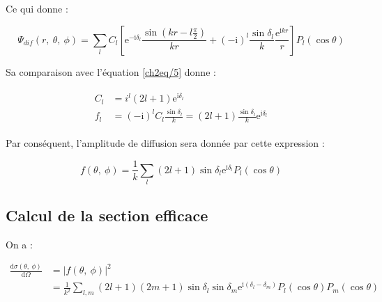\documentclass[12pt,a4paper,oneside,french]{book}
\renewcommand{\i}{\mathrm{i}}
\newcommand{\e}{\mathrm{e}}
\newcommand{\diff}{\mathrm{d}}
\theoremstyle{definition}
\theoremstyle{definition}
\theoremstyle{definition}
\theoremstyle{remark}
\theoremstyle{definition}
\begin{document}
    Ce qui donne :

    \begin{equation*}
        {\Psi}_{dif}(r, \ \theta, \ \phi) = \sum_{l} {C}_{l} \left[{\e}^{-\i {\delta}_{l}} \frac{\sin\left(k r - l \frac{\pi}{2}\right)}{k r} + {(-\i)}^{l} \frac{\sin{{\delta}_{l}}}{k} \frac{{\e}^{\i k r}}{r}\right] {P}_{l}(\cos{\theta})
    \end{equation*}

    Sa comparaison avec l'équation \eqref{ch2eq/5} donne :
    
    \begin{align*}
    \begin{split}
        {C}_{l} &= {i}^{l} (2l + 1) {\e}^{\i {\delta}_{l}} \\
        {f}_{l} &= {(-\i)}^{l} {C}_{l} \frac{\sin{{\delta}_{l}}}{k} = (2l + 1) \frac{\sin{{\delta}_{l}}}{k} {\e}^{\i {\delta}_{l}}
    \end{split}
    \end{align*}
    
    Par conséquent, l'amplitude de diffusion sera donnée par cette expression :
    
    \begin{equation} \label{ch2eq/6}
        f(\theta, \ \phi) = \frac{1}{k} \sum_{l} (2l + 1) \sin{{\delta}_{l}} {\e}^{\i {\delta}_{l}} {P}_{l}(\cos{\theta})
    \end{equation}
    
    \subsection{Calcul de la section efficace}
    On a :
    
    \begin{equation*}
    \begin{split}
        \frac{\diff \sigma(\theta, \ \phi)}{\diff \Omega} 
            &= {\left\lvert{f}(\theta, \ \phi)\right\rvert}^{2} \\
            &= \frac{1}{{k}^{2}} \sum_{l, m} (2l + 1)(2m + 1) \sin{{\delta}_{l}} \sin{{\delta}_{m}} {\e}^{\i \left({\delta}_{l} - {\delta}_{m}\right)} {P}_{l}(\cos{\theta}) {P}_{m}(\cos{\theta})
    \end{split}
    \end{equation*}
    
\end{document}
